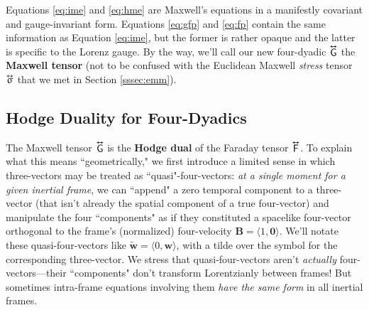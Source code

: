 \documentclass[12pt]{article}
\renewcommand{\vv}[1]{\mathbf{#1}}
\newcommand{\tightoverset}[2]{%
  \mathop{#2}\limits^{\vbox to -.5ex{\kern-0.75ex\hbox{$#1$}\vss}}}
\newcommand{\inlinedy}[1]{\tightoverset{\text{\tiny$\bm\leftrightarrow$}}{#1}}
\begin{document}
Equations \ref{eq:ime} and \ref{eq:hme} are Maxwell's equations in a manifestly covariant and gauge-invariant form. Equations \ref{eq:gfp} and \ref{eq:fp} contain the same information as Equation \ref{eq:ime}, but the former is rather opaque and the latter is specific to the Lorenz gauge. By the way, we'll call our new four-dyadic $\inlinedy{\mathsf{G}}$ the \textbf{Maxwell tensor} (not to be confused with the Euclidean Maxwell \emph{stress} tensor $\inlinedy{\upsigma}$ that we met in Section \ref{sssec:emm}).


\subsection{Hodge Duality for Four-Dyadics}\label{sssec:hd}

The Maxwell tensor $\inlinedy{\mathsf{G}}$ is the \textbf{Hodge dual} of the Faraday tensor $\inlinedy{\mathsf{F}}$. To explain what this means ``geometrically," we first introduce a limited sense in which three-vectors may be treated as ``quasi"-four-vectors: \emph{at a single moment for a given inertial frame}, we can ``append" a zero temporal component to a three-vector (that isn't already the spatial component of a true four-vector) and manipulate the four ``components" as if they constituted a spacelike four-vector orthogonal to the frame's (normalized) four-velocity $\vv B = \langle 1, \vv 0 \rangle$. We'll notate these quasi-four-vectors like $\tilde{\vv w} = \langle 0, \vv w \rangle$, with a tilde over the symbol for the corresponding three-vector. We stress that quasi-four-vectors aren't \emph{actually} four-vectors---their ``components" don't transform Lorentzianly between frames! But sometimes intra-frame equations involving them \emph{have the same form} in all inertial frames.
\end{document}
